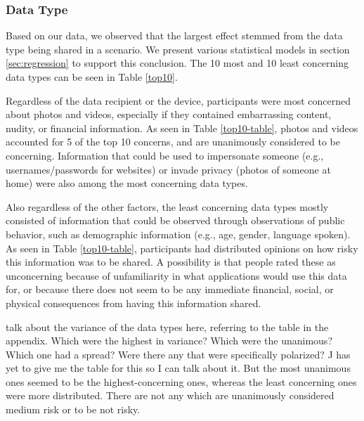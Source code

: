 \subsubsection{Data Type}
Based on our data, we observed that the largest effect stemmed from the data type being shared in a scenario. We present various statistical models in section \ref{sec:regression} to support this conclusion. The 10 most and 10 least concerning data types can be seen in Table \ref{top10}. 

Regardless of the data recipient or the device, participants were most concerned about photos and videos, especially if they contained embarrassing content, nudity, or financial information. As seen in Table \ref{top10-table}, photos and videos accounted for 5 of the top 10 concerns, {\color {red} and are unanimously considered to be concerning}. Information that could be used to impersonate someone (e.g., usernames/passwords for websites) or invade privacy (photos of someone at home) were also among the most concerning data types. 

Also regardless of the other factors, the least concerning data types mostly consisted of information that could be observed through observations of public behavior, such as demographic information (e.g., age, gender, language spoken). {\color {red} As seen in Table \ref{top10-table}, participants had distributed opinions on how risky this information was to be shared. A possibility is that people rated these as unconcerning because of unfamiliarity in what applications would use this data for, or because there does not seem to be any immediate financial, social, or physical consequences from having this information shared.}

{\color {red} talk about the variance of the data types here, referring to the table in the appendix. Which were the highest in variance? Which were the unanimous? Which one had a spread? Were there any that were specifically polarized? J has yet to give me the table for this so I can talk about it. But the most unanimous ones seemed to be the highest-concerning ones, whereas the least concerning ones were more distributed. There are not any which are unanimously considered medium risk or to be not risky.}

